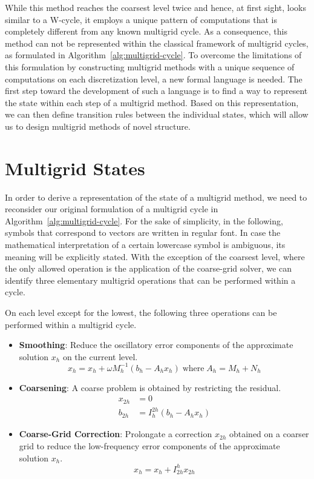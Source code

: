 While this method reaches the coarsest level twice and hence, at first sight, looks similar to a W-cycle, it employs a unique pattern of computations that is completely different from any known multigrid cycle.
As a consequence, this method can not be represented within the classical framework of multigrid cycles, as formulated in Algorithm~\ref{alg:multigrid-cycle}.
To overcome the limitations of this formulation by constructing multigrid methods with a unique sequence of computations on each discretization level, a new formal language is needed.
The first step toward the development of such a language is to find a way to represent the state within each step of a multigrid method.
Based on this representation, we can then define transition rules between the individual states, which will allow us to design multigrid methods of novel structure.
\section{Multigrid States}
\label{sec:multigrid-states}
In order to derive a representation of the state of a multigrid method, we need to reconsider our original formulation of a multigrid cycle in Algorithm~\ref{alg:multigrid-cycle}.
For the sake of simplicity, in the following, symbols that correspond to vectors are written in regular font.
In case the mathematical interpretation of a certain lowercase symbol is ambiguous, its meaning will be explicitly stated. 
With the exception of the coarsest level, where the only allowed operation is the application of the coarse-grid solver, we can identify three elementary multigrid operations that can be performed within a cycle.
\begin{definition}
\label{def:elementary-multigrid-operations}
On each level except for the lowest, the following three operations can be performed within a multigrid cycle.
\begin{itemize}
	\item \textbf{Smoothing}: Reduce the oscillatory error components of the approximate solution $x_h$ on the current level. 
	\begin{equation}
		x_h = x_h + \omega M_h^{-1} \left( b_h - A_h x_h \right) \; \text{where} \; A_h = M_h + N_h
	\end{equation}
	\item \textbf{Coarsening}: A coarse problem is obtained by restricting the residual.
	\begin{equation}
    \begin{split}
     	x_{2h} & = 0 \\
		b_{2h} & = I_h^{2h} (b_h - A_h x_h)
    \end{split}
	\end{equation}
	\item \textbf{Coarse-Grid Correction}: Prolongate a correction $x_{2h}$ obtained on a coarser grid to reduce the low-frequency error components of the approximate solution $x_h$.
	\begin{equation}
		x_h = x_h + I_{2h}^h x_{2h}
	\end{equation}
\end{itemize}
\end{definition}
